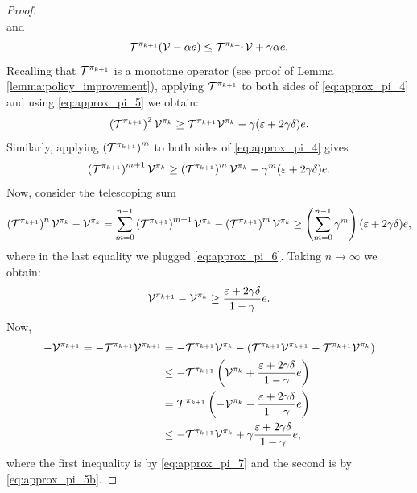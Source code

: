 \begin{proof}
\begin{equation}
    \end{equation}
    and
    \begin{equation}\label{eq:approx_pi_5b}
        \mathcal{T}^{\pi_{k+1}}(\mathcal{V} - \alpha e) \leq \mathcal{T}^{\pi_{k+1}}\mathcal{V} + \gamma \alpha e.
    \end{equation}
    Recalling that $\mathcal{T}^{\pi_{k+1}}$ is a monotone operator (see proof of Lemma \ref{lemma:policy_improvement}), applying $\mathcal{T}^{\pi_{k+1}}$ to both sides of \eqref{eq:approx_pi_4} and using \eqref{eq:approx_pi_5} we obtain:
    \begin{equation*}
    \left(\mathcal{T}^{\pi_{k+1}}\right)^2\mathcal{V}^{\pi_k} \geq \mathcal{T}^{\pi_{k+1}}\mathcal{V}^{\pi_k} - \gamma(\varepsilon + 2 \gamma \delta) e.
    \end{equation*}
    Similarly, applying $\left(\mathcal{T}^{\pi_{k+1}}\right)^m$ to both sides of \eqref{eq:approx_pi_4} gives
    \begin{equation}\label{eq:approx_pi_6}
    \left(\mathcal{T}^{\pi_{k+1}}\right)^{m+1}\mathcal{V}^{\pi_k} \geq \left(\mathcal{T}^{\pi_{k+1}}\right)^m\mathcal{V}^{\pi_k} - \gamma^m(\varepsilon + 2 \gamma \delta) e.
    \end{equation}
    Now, consider the telescoping sum 
    \begin{equation*}    \left(\mathcal{T}^{\pi_{k+1}}\right)^{n}\mathcal{V}^{\pi_k} - \mathcal{V}^{\pi_k} = \sum_{m=0}^{n-1}\left(\mathcal{T}^{\pi_{k+1}}\right)^{m+1}\mathcal{V}^{\pi_k} - \left(\mathcal{T}^{\pi_{k+1}}\right)^m\mathcal{V}^{\pi_k} \geq \left(\sum_{m=0}^{n-1}\gamma^m\right)(\varepsilon + 2 \gamma \delta) e,
    \end{equation*}
    where in the last equality we plugged \eqref{eq:approx_pi_6}. Taking $n \to \infty$ we obtain:
    \begin{equation}\label{eq:approx_pi_7}
        \mathcal{V}^{\pi_{k+1}} - \mathcal{V}^{\pi_k} \geq \frac{\varepsilon + 2 \gamma \delta}{1 - \gamma}e.
    \end{equation}
    Now,
    \begin{equation*}
    \begin{split}
        -\mathcal{V}^{\pi_{k+1}} = -\mathcal{T}^{\pi_{k+1}}\mathcal{V}^{\pi_{k+1}} &= -\mathcal{T}^{\pi_{k+1}}\mathcal{V}^{\pi_{k}} - \left( \mathcal{T}^{\pi_{k+1}}\mathcal{V}^{\pi_{k+1}} - \mathcal{T}^{\pi_{k+1}}\mathcal{V}^{\pi_{k}}\right) \\ 
        &\leq -\mathcal{T}^{\pi_{k+1}}\left(\mathcal{V}^{\pi_{k}} + \frac{\varepsilon + 2 \gamma \delta}{1 - \gamma}e \right)\\
        &= \mathcal{T}^{\pi_{k+1}}\left(-\mathcal{V}^{\pi_{k}} - \frac{\varepsilon + 2 \gamma \delta}{1 - \gamma}e \right)\\
        &\leq -\mathcal{T}^{\pi_{k+1}}\mathcal{V}^{\pi_{k}} + \gamma \frac{\varepsilon + 2 \gamma \delta}{1 - \gamma}e,
    \end{split}
    \end{equation*}
    where the first inequality is by \eqref{eq:approx_pi_7} and the second is by \eqref{eq:approx_pi_5b}.


\end{proof}
